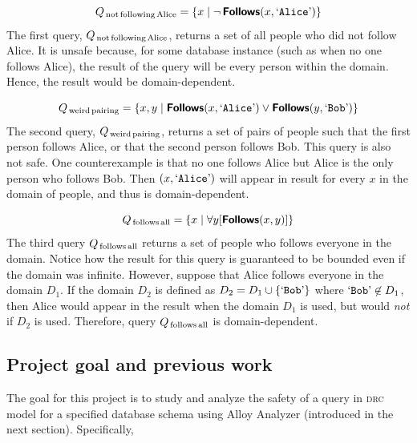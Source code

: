 \smallskip
\begin{example}
    \label{ex:not-follow}
    \[
        Q_\text{\,not\,following\,Alice} =
            \{ x \mid \neg\,\text{\textnormal{\textsf{\textbf{Follows}}}}(x, \text{\textnormal{`\ttfamily{Alice}}'}) \}
    \]
    The first query, $Q_\text{\,not\,following\,Alice}$, returns a set of all people who did not follow Alice. It is unsafe because, for some database instance (such as when no one follows Alice), the result of the query will be every person within the domain. Hence, the result would be domain-dependent.
\end{example}

\begin{example}
    \[
        Q_\text{\,weird\,pairing} =
            \{ x, y \mid \text{\textnormal{\textsf{\textbf{Follows}}}}(x, \text{\textnormal{`\ttfamily{Alice}}'}) \vee \text{\textnormal{\textsf{\textbf{Follows}}}}(y, \text{\textnormal{`\ttfamily{Bob}}'}) \}
    \]
    The second query, $Q_\text{\,weird\,pairing}$, returns a set of pairs of people such that the first person follows Alice, or that the second person follows Bob. This query is also not safe. One counterexample is that no one follows Alice but Alice is the only person who follows Bob. Then $(x, \text{\textnormal{`\ttfamily{Alice}}'})$ will appear in result for every $x$ in the domain of people, and thus is domain-dependent.
\end{example}

\begin{example}
    \label{ex:follow-all}
    \[
        Q_\text{\,follows\,all} =
            \{ x \mid \forall y[\text{\textnormal{\textsf{\textbf{Follows}}}}(x, y)] \}
    \]
    The third query $Q_\text{\,follows\,all}$ returns a set of people who follows everyone in the domain. Notice how the result for this query is guaranteed to be bounded even if the domain was infinite. However, suppose that Alice follows everyone in the domain $D_1$. If the domain $D_2$ is defined as $D_2 = D_1 \cup \{\text{\textnormal{`\ttfamily{Bob}}'}\}$ where $\text{\textnormal{`\ttfamily{Bob}}'} \not\in D_1$, then Alice would appear in the result when the domain $D_1$ is used, but would \emph{not} if $D_2$ is used. Therefore, query $Q_\text{\,follows\,all}$ is domain-dependent.
\end{example}


\subsection{Project goal and previous work}
\label{sub:goal}

The goal for this project is to study and analyze the safety of a query in \textsc{drc} model for a specified database schema using Alloy Analyzer (introduced in the next section). Specifically,

